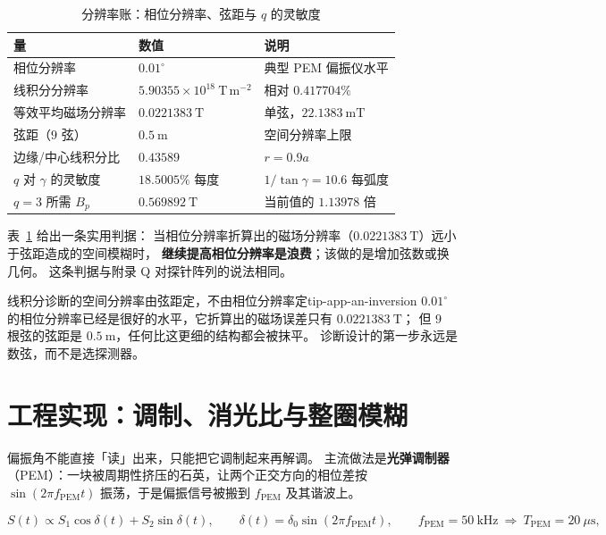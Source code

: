 \begin{table}[htbp]
\centering
\caption{分辨率账：相位分辨率、弦距与 $q$ 的灵敏度}
\label{tab:app-an-inversion}
\small
\begin{tabular}{p{4.4cm} p{3.2cm} p{5.8cm}}
\toprule
量 & 数值 & 说明 \\
\midrule
相位分辨率 & $0.01^\circ$ & 典型 PEM 偏振仪水平 \\
线积分分辨率 & $5.90355\times10^{18}\ \mathrm{T\,m^{-2}}$ & 相对 $0.417704\%$ \\
等效平均磁场分辨率 & $0.0221383\ \mathrm{T}$ & 单弦，$22.1383\ \mathrm{mT}$ \\
弦距（$9$ 弦） & $0.5\ \mathrm{m}$ & 空间分辨率上限 \\
边缘/中心线积分比 & $0.43589$ & $r=0.9a$ \\
$q$ 对 $\gamma$ 的灵敏度 & $18.5005\%$ 每度 & $1/\tan\gamma=10.6$ 每弧度 \\
$q=3$ 所需 $B_p$ & $0.569892\ \mathrm{T}$ & 当前值的 $1.13978$ 倍 \\
\bottomrule
\end{tabular}
\end{table}

表~\ref{tab:app-an-inversion} 给出一条实用判据：
当相位分辨率折算出的磁场分辨率（$0.0221383\ \mathrm{T}$）远小于弦距造成的空间模糊时，
\textbf{继续提高相位分辨率是浪费}；该做的是增加弦数或换几何。
这条判据与附录 Q 对探针阵列的说法相同。

\begin{tip}{线积分诊断的空间分辨率由弦距定，不由相位分辨率定}{tip-app-an-inversion}
$0.01^\circ$ 的相位分辨率已经是很好的水平，它折算出的磁场误差只有 $0.0221383\ \mathrm{T}$；
但 $9$ 根弦的弦距是 $0.5\ \mathrm{m}$，任何比这更细的结构都会被抹平。
诊断设计的第一步永远是数弦，而不是选探测器。
\end{tip}

\section{工程实现：调制、消光比与整圈模糊}
\label{sec:app-an-engineering}

偏振角不能直接「读」出来，只能把它调制起来再解调。
主流做法是\textbf{光弹调制器}（PEM）：一块被周期性挤压的石英，让两个正交方向的相位差按
$\sin(2\pi f_{\mathrm{PEM}}t)$ 振荡，于是偏振信号被搬到 $f_{\mathrm{PEM}}$ 及其谐波上。

\begin{equation}
S(t)\propto S_1\cos\delta(t)+S_2\sin\delta(t),
\qquad
\delta(t)=\delta_0\sin(2\pi f_{\mathrm{PEM}}t),
\qquad
f_{\mathrm{PEM}}=50\ \mathrm{kHz}\ \Rightarrow\ T_{\mathrm{PEM}}=20\ \mu\mathrm{s},
\label{eq:app-an-pem}
\end{equation}

